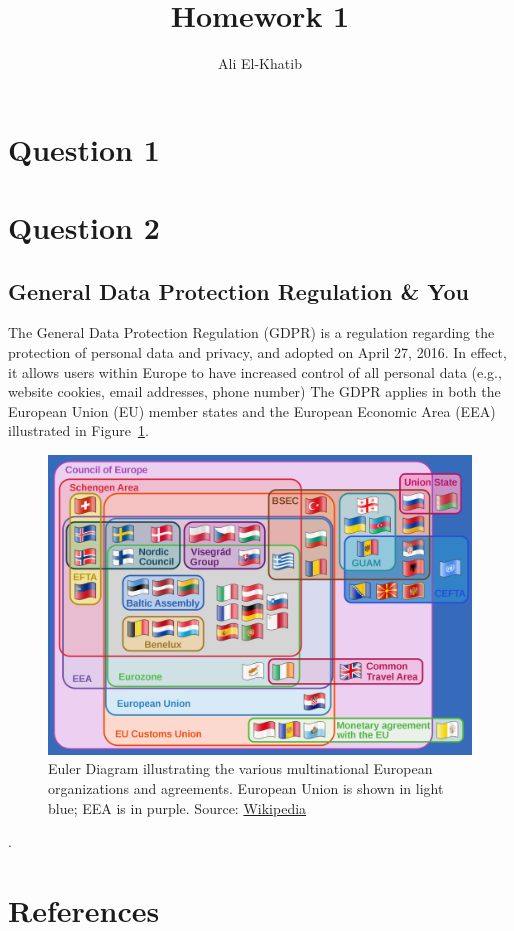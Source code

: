 \documentclass[
	letterpaper, %
]{jdf}
\author{Ali El-Khatib}
\title{Homework 1}
\begin{document}
\maketitle
\section{Question 1}

\section{Question 2}
\subsection{General Data Protection Regulation & You}
The General Data Protection Regulation (GDPR) is a regulation regarding the protection of personal data and privacy, and adopted on April 27, 2016. In effect, it allows users within Europe to have increased control of all personal data (e.g., website cookies, email addresses, phone number)   The GDPR applies in both the European Union (EU) member states and the European Economic Area (EEA) illustrated in Figure~\ref{fig:europe-groups}. 
\begin{figure}
	\centering
	\includegraphics[width=0.7\linewidth]{../figures/europe-groups}
	\caption{Euler Diagram illustrating the various multinational European organizations and agreements. European Union is shown in light blue; EEA is in purple. Source: \href{https://en.wikipedia.org/wiki/File:Supranational_European_Bodies-en.svg}{Wikipedia}
	}
	\label{fig:europe-groups}
\end{figure}
.

\section{References}
\end{document}
